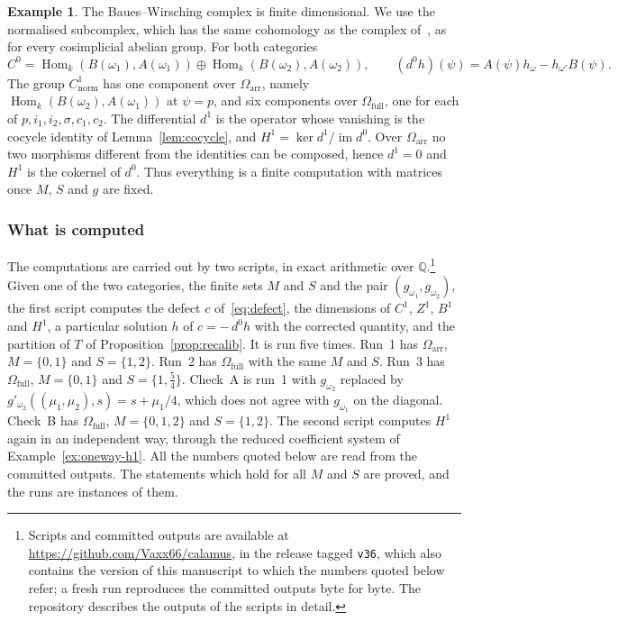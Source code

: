 \documentclass[11pt,a4paper]{article}
\theoremstyle{plain}
\theoremstyle{definition}
\newtheorem{example}[theorem]{Example}
\theoremstyle{remark}
\newcommand{\cat}[1]{\mathsf{#1}}
\newcommand{\catO}{\cat{\Omega}}
\DeclareMathOperator{\Hom}{Hom}
\begin{document}
\begin{example}
The Baues--Wirsching complex is finite dimensional. We use the normalised
subcomplex, which has the same cohomology as the complex
of~\cite[(1.4)]{baues_cohomology_1985}, as for every cosimplicial abelian
group. For both categories
\[
C^{0} = \Hom_k(B(\omega_1), A(\omega_1)) \oplus \Hom_k(B(\omega_2),
A(\omega_2)),
\qquad
(d^{0}h)(\psi) = A(\psi)h_\omega - h_{\omega'}B(\psi).
\]
The group $C^{1}_{\mathrm{norm}}$ has one component over
$\catO_{\mathrm{arr}}$, namely $\Hom_k(B(\omega_2),A(\omega_1))$ at
$\psi = p$, and six components over $\catO_{\mathrm{full}}$, one for each of
$p, i_1, i_2, \sigma, c_1, c_2$. The differential $d^{1}$ is the operator
whose vanishing is the cocycle identity of Lemma~\ref{lem:cocycle}, and
$H^{1} = \ker d^{1}/\operatorname{im} d^{0}$. Over $\catO_{\mathrm{arr}}$ no
two morphisms different from the identities can be composed, hence
$d^{1} = 0$ and $H^{1}$ is the cokernel of $d^{0}$. Thus everything is a
finite computation with matrices once $M$, $S$ and $g$ are fixed.
\end{example}

\subsubsection*{What is computed}

The computations are carried out by two scripts, in exact arithmetic over
$\mathbb{Q}$.\footnote{Scripts and committed outputs are available at
\url{https://github.com/Vaxx66/calamus}, in the release tagged
\texttt{v36}, which also contains the version of this manuscript to which
the numbers quoted below refer; a fresh run reproduces the committed outputs
byte for byte. The repository describes the outputs of the scripts in
detail.} Given one of the two categories, the finite sets $M$ and $S$ and the
pair $(g_{\omega_1}, g_{\omega_2})$, the first script computes the defect $c$
of~\eqref{eq:defect}, the dimensions of $C^{1}$, $Z^{1}$, $B^{1}$ and $H^{1}$,
a particular solution $h$ of $c = -\,d^{0}h$ with the corrected quantity, and
the partition of $T$ of Proposition~\ref{prop:recalib}. It is run five times.
Run~1 has $\catO_{\mathrm{arr}}$, $M = \{0,1\}$ and $S = \{1,2\}$. Run~2 has
$\catO_{\mathrm{full}}$ with the same $M$ and $S$. Run~3 has
$\catO_{\mathrm{full}}$, $M = \{0,1\}$ and $S = \{1,\tfrac54\}$. Check~A is
run~1 with $g_{\omega_2}$ replaced by
$g'_{\omega_2}((\mu_1,\mu_2),s) = s + \mu_1/4$, which does not agree with
$g_{\omega_1}$ on the diagonal. Check~B has $\catO_{\mathrm{full}}$,
$M = \{0,1,2\}$ and $S = \{1,2\}$. The second script computes $H^{1}$ again in
an independent way, through the reduced coefficient system of
Example~\ref{ex:oneway-h1}. All the numbers quoted below are read from the
committed outputs. The statements which hold for all $M$ and $S$ are proved,
and the runs are instances of them.
\end{document}
